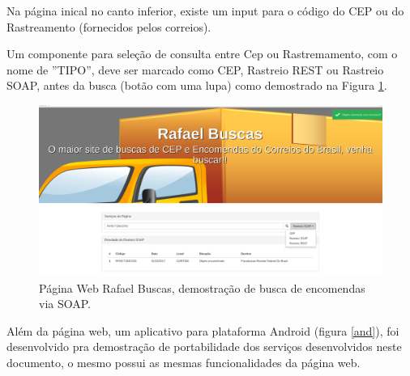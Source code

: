 \documentclass[a4paper, 12pt]{article}
\begin{document}
Na página inical no canto inferior, existe um input para o código do CEP ou do Rastreamento (fornecidos pelos correios).

Um componente para seleção de consulta entre Cep ou Rastremamento, com o nome de ''TIPO'', deve ser marcado como CEP, Rastreio REST ou Rastreio SOAP, antes da busca (botão com uma lupa) como demostrado na Figura \ref{c2}.

\begin{figure}[H]
	\centering
	\includegraphics[scale=0.23]{Imagens/c2.jpg}
	\caption{Página Web Rafael Buscas, demostração de busca de encomendas via SOAP.}
	\label{c2}
\end{figure}

Além da página web, um aplicativo para plataforma Android (figura \ref{and}), foi desenvolvido pra demostração de portabilidade dos serviços desenvolvidos neste documento, o mesmo possui as mesmas funcionalidades da página web.
\end{document}
